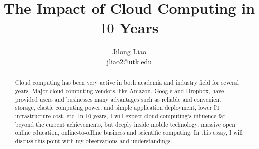 \documentclass[11pt, times]{article}
\begin{document}
\title{The Impact of Cloud Computing in $10$ Years}
\author{Jilong Liao\\jliao2@utk.edu}
\maketitle

\begin{abstract}
Cloud computing has been very active in both academia and industry field for several years. Major cloud computing vendors, like Amazon, Google and Dropbox, have provided users and businesses many advantages such as reliable and convenient storage, elastic computing power, and simple application deployment, lower IT infrastructure cost, etc. In $10$ years, I will expect cloud computing's influence far beyond the current achievements, but deeply inside mobile technology, massive open online education, online-to-offline business and scientific computing. In this essay, I will discuss this point with my observations and understandings.
\end{abstract}





\end{document}
